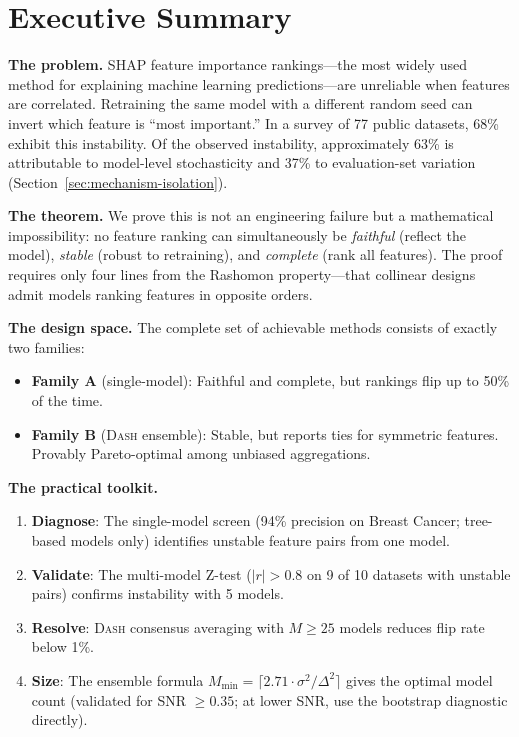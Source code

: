\documentclass{article}
\newcommand{\DASH}{\textsc{Dash}}
\begin{document}
\section*{Executive Summary}

\noindent\textbf{The problem.} SHAP feature importance rankings---the most widely used method for explaining machine learning predictions---are unreliable when features are correlated. Retraining the same model with a different random seed can invert which feature is ``most important.'' In a survey of 77 public datasets, 68\% exhibit this instability. Of the observed instability, approximately 63\% is attributable to model-level stochasticity and 37\% to evaluation-set variation (Section~\ref{sec:mechanism-isolation}).

\noindent\textbf{The theorem.} We prove this is not an engineering failure but a mathematical impossibility: no feature ranking can simultaneously be \emph{faithful} (reflect the model), \emph{stable} (robust to retraining), and \emph{complete} (rank all features). The proof requires only four lines from the Rashomon property---that collinear designs admit models ranking features in opposite orders.

\noindent\textbf{The design space.} The complete set of achievable methods consists of exactly two families:
\begin{itemize}
    \item \textbf{Family A} (single-model): Faithful and complete, but rankings flip up to 50\% of the time.
    \item \textbf{Family B} (\DASH{} ensemble): Stable, but reports ties for symmetric features. Provably Pareto-optimal among unbiased aggregations.
\end{itemize}

\noindent\textbf{The practical toolkit.}
\begin{enumerate}
    \item \textbf{Diagnose}: The single-model screen (94\% precision on Breast Cancer; tree-based models only) identifies unstable feature pairs from one model.
    \item \textbf{Validate}: The multi-model Z-test ($|r| > 0.8$ on 9 of 10 datasets with unstable pairs) confirms instability with 5 models.
    \item \textbf{Resolve}: \DASH{} consensus averaging with $M \geq 25$ models reduces flip rate below 1\%.
    \item \textbf{Size}: The ensemble formula $M_{\min} = \lceil 2.71 \cdot \sigma^2/\Delta^2 \rceil$ gives the optimal model count (validated for SNR $\geq 0.35$; at lower SNR, use the bootstrap diagnostic directly).
\end{enumerate}
\end{document}

